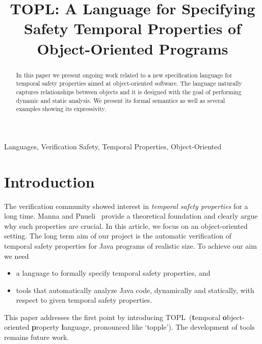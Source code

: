 \documentclass{sigplanconf} %
\title{TOPL: A Language for Specifying Safety Temporal Properties of Object-Oriented Programs}
\newcommand{\TPL}{TOPL}
\theoremstyle{definition}
\theoremstyle{remark}
\begin{document}
\maketitle

\begin{abstract} %
In this paper we present ongoing work related to a new specification language for temporal safety properties aimed at object-oriented software.
The language naturally captures relationships between objects and it is designed with the goal of performing dynamic and static analysis.
We present its formal semantics as well as several examples showing its expressivity.
\end{abstract}
\terms Languages, Verification
\keywords Safety, Temporal Properties, Object-Oriented

\section{Introduction} %

The verification community showed interest in \emph{temporal safety properties} for a long time.
Manna and Pnueli~\cite{dblp:books/daglib/0080029} provide a theoretical foundation and clearly argue why such properties are crucial.
In this article, we focus on an object-oriented setting.
The long term aim of our project is the automatic verification of temporal safety properties for Java programs of realistic size.
To achieve our aim we need
\begin{itemize}
\item a language to formally specify temporal safety properties, and
\item tools that automatically analyze Java code, dynamically and statically, with respect to given temporal safety properties.
\end{itemize}
This paper addresses the first point by introducing \TPL\ (\textbf{t}emporal \textbf{o}bject-oriented \textbf{p}roperty \textbf{l}anguage, pronounced like `topple').
The development of tools remains future work.
\end{document}
